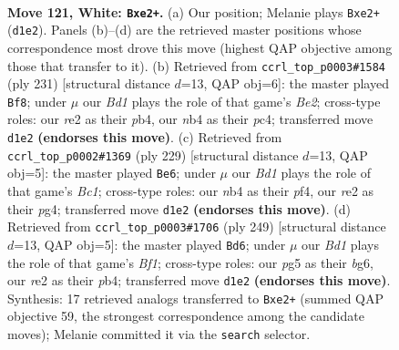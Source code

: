 \documentclass[11pt]{article}
\begin{document}
\clearpage

\begin{figure}[p]\centering
\begin{subfigure}{0.46\textwidth}\centering
\resizebox{\linewidth}{!}{%
\newchessgame
\chessboard[
  setfen={8/8/8/6pk/1n6/6K1/4r3/3B4 w - - 26 121},
  showmover=false,
  pgfstyle=straightmove, color=movearrow, markmove={d1-e2}
]}
\caption{}
\end{subfigure}\hfill
\begin{subfigure}{0.46\textwidth}\centering
\resizebox{\linewidth}{!}{%
\newchessgame
\chessboard[
  setfen={8/4b3/1k6/8/1PP1B3/K7/8/8 b - - 52 116},
  showmover=false,
  pgfstyle=straightmove, color=movearrow, markmove={e7-f8}
]}
\caption{}
\end{subfigure}
\\[4pt]
\begin{subfigure}{0.46\textwidth}\centering
\resizebox{\linewidth}{!}{%
\newchessgame
\chessboard[
  setfen={2b5/8/6k1/8/5PP1/2B4K/8/8 b - - 70 115},
  showmover=false,
  pgfstyle=straightmove, color=movearrow, markmove={c8-e6}
]}
\caption{}
\end{subfigure}\hfill
\begin{subfigure}{0.46\textwidth}\centering
\resizebox{\linewidth}{!}{%
\newchessgame
\chessboard[
  setfen={5b2/8/1k4B1/8/1PP5/K7/8/8 b - - 50 125},
  showmover=false,
  pgfstyle=straightmove, color=movearrow, markmove={f8-d6}
]}
\caption{}
\end{subfigure}
\caption{\textbf{Move 121, White: \texttt{Bxe2+}.} (a) Our position; Melanie plays \texttt{Bxe2+} (\texttt{d1e2}). Panels (b)--(d) are the retrieved master positions whose correspondence most drove this move (highest QAP objective among those that transfer to it). (b) Retrieved from \texttt{ccrl\_top\_p0003\#1584} (ply 231) [structural distance $d$=13, QAP obj=6]: the master played \texttt{Bf8}; under $\mu$ our \emph{Bd1} plays the role of that game's \emph{Be2}; cross-type roles: our \emph{r}e2 as their \emph{p}b4, our \emph{n}b4 as their \emph{p}c4; transferred move \texttt{d1e2} \textbf{(endorses this move)}. (c) Retrieved from \texttt{ccrl\_top\_p0002\#1369} (ply 229) [structural distance $d$=13, QAP obj=5]: the master played \texttt{Be6}; under $\mu$ our \emph{Bd1} plays the role of that game's \emph{Bc1}; cross-type roles: our \emph{n}b4 as their \emph{p}f4, our \emph{r}e2 as their \emph{p}g4; transferred move \texttt{d1e2} \textbf{(endorses this move)}. (d) Retrieved from \texttt{ccrl\_top\_p0003\#1706} (ply 249) [structural distance $d$=13, QAP obj=5]: the master played \texttt{Bd6}; under $\mu$ our \emph{Bd1} plays the role of that game's \emph{Bf1}; cross-type roles: our \emph{p}g5 as their \emph{b}g6, our \emph{r}e2 as their \emph{p}b4; transferred move \texttt{d1e2} \textbf{(endorses this move)}. Synthesis: 17 retrieved analogs transferred to \texttt{Bxe2+} (summed QAP objective 59, the strongest correspondence among the candidate moves); Melanie committed it via the \texttt{search} selector.}
\label{fig:thought-m240}
\end{figure}
\end{document}
